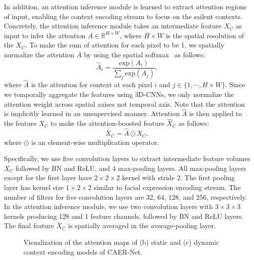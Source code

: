 \documentclass[10pt,twocolumn,letterpaper]{article}
\begin{document}
In addition, an attention inference module is learned to extract attention regions of input, enabling the context encoding stream to focus on the sailent contexts.
Concretely, the attention inference module takes an intermediate feature $X_C$ as input to infer the attention $A \in \mathbb{R}^{H \times W}$, where $H\times W$ is the spatial resolution of the $X_C$.
To make the sum of attention for each pixel to be 1, we spatially normalize the attention $A$ by using the spatial softmax~\cite{sharma2015action} as follows:
\begin{equation}
\hat{A}_{i} = \frac{\mathrm{exp}(A_i)}{\sum_{j} \mathrm{exp}(A_j)},
\end{equation}
where $\hat{A}$ is the attention for context at each pixel $i$ and $j \in \{1, \cdots, H \times W\}$.
Since we temporally aggregate the features using 3D-CNNs, we only normalize the attention weight across spatial axises not temporal axis.
Note that the attention is implicitly learned in an unsupervised manner.
Attention $\hat{A}$ is then applied to the feature $X_C$ to make the attention-boosted feature $\hat{X}_C$ as follows:
\begin{equation}
\bar{X}_C = \hat{A} \odot X_C,
\end{equation}
where $\odot$ is an element-wise multiplication operator.

Specifically, we use five convolution layers to extract intermediate feature volumes $X_C$ followed by BN and ReLU, and 4 max-pooling layers.
All max-pooling layers except for the first layer have $2 \times 2 \times 2$ kernel with stride $2$.
The first pooling layer has kernel size $1 \times 2 \times 2$ similar to facial expression encoding stream.
The number of filters for five convolution layers are 32, 64, 128, and 256, respectively.
In the attention inference module, we use two convolution layers with $3 \times 3 \times 3$ kernels producing 128 and 1 feature channels, followed by BN and ReLU layers.
The final feature $\bar{X}_C$ is spatially averaged in the average-pooling layer.\vspace{-10pt}

\begin{figure}
	\centering
	\renewcommand{\thesubfigure}{}
	\hfill
	\hfill
	\hfill
	\caption{Visualization of the attention maps of (b) static and (c) dynamic context encoding models of CAER-Net.}
	\label{fig:3}\vspace{-10pt}
\end{figure}
\end{document}
